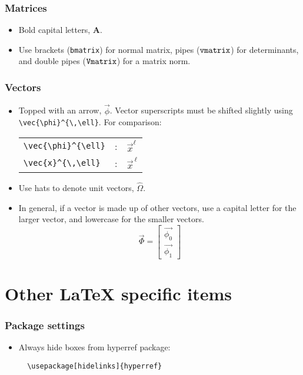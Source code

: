 \documentclass[10pt, letter]{article}
\begin{document}
\begin{multicols}{2}
\subsubsection*{Matrices}
\begin{itemize}
\item Bold capital letters, $\mathbf{A}$.
\item Use brackets (\verb|bmatrix|) for normal matrix, pipes
  ($\verb|vmatrix|$) for
  determinants, and double pipes ($\verb|Vmatrix|$) for a matrix norm.
\end{itemize}

\subsubsection*{Vectors}
\begin{itemize}
\item Topped with an arrow, $\vec{\phi}$. Vector superscripts must be shifted
slightly using \verb|\vec{\phi}^{\,\ell}|. For comparison:
\begin{center}
  \begin{tabular}[h!]{lcl}
    \verb|\vec{\phi}^{\ell}| & : & $\vec{x}^{\ell}$ \\
    \verb|\vec{x}^{\,\ell}| & : & $\vec{x}^{\,\ell}$
  \end{tabular}
\end{center}
\item Use hats to denote unit vectors, $\hat{\Omega}$.
\item In general, if a vector is made up of other vectors, use a
  capital letter for the larger vector, and lowercase for the smaller
  vectors.
\begin{equation*}
    \vec{\Phi} =
    \begin{bmatrix}
      \vec{\phi_0} \\ \vec{\phi_1}
    \end{bmatrix}
\end{equation*}
\end{itemize}

\pagebreak

\section{Other \LaTeX{} specific items}\label{sec:latex}

\subsubsection*{Package settings}
\begin{itemize}
\item Always hide boxes from hyperref package:
\begin{lstlisting}
  \usepackage[hidelinks]{hyperref}
\end{lstlisting}
\end{itemize}



\end{multicols}
\end{document}
